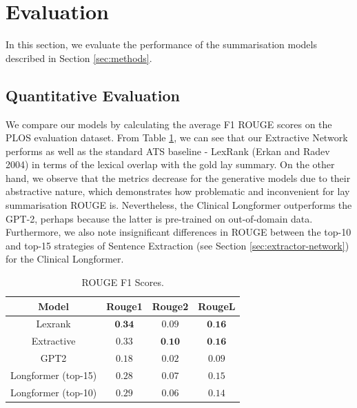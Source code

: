 \documentclass[
]{article}
\begin{document}
\hypertarget{sec:evaluation}{%
\section{Evaluation}\label{sec:evaluation}}

In this section, we evaluate the performance of the summarisation models
described in Section \ref{sec:methods}.

\hypertarget{sec:evaluation-quantitative}{%
\subsection{Quantitative Evaluation}\label{sec:evaluation-quantitative}}

We compare our models by calculating the average F1 ROUGE scores on the
PLOS evaluation dataset. From Table \ref{tab:dataset_stats}, we can see
that our Extractive Network performs as well as the standard ATS
baseline - LexRank (Erkan and Radev 2004) in terms of the lexical
overlap with the gold lay summary. On the other hand, we observe that
the metrics decrease for the generative models due to their abstractive
nature, which demonstrates how problematic and inconvenient for lay
summarisation ROUGE is. Nevertheless, the Clinical Longformer
outperforms the GPT-2, perhaps because the latter is pre-trained on
out-of-domain data. Furthermore, we also note insignificant differences
in ROUGE between the top-10 and top-15 strategies of Sentence Extraction
(see Section \ref{sec:extractor-network}) for the Clinical Longformer.

\begin{table}[htbp]
    \centering
    \begin{tabular}{|c|c|c|c|}
        \hline
        \textbf{Model} & \textbf{Rouge1} & \textbf{Rouge2} & \textbf{RougeL} \\
        \hline
            Lexrank & $\textbf{0.34}$ & $0.09$ & $\textbf{0.16}$ \\
        \hline
            Extractive & $0.33$ & $\textbf{0.10}$ & $\textbf{0.16}$ \\
        \hline
            GPT2 & $0.18$ & $0.02$ & $0.09$ \\
        \hline
            Longformer (top-15) & $0.28$ & $0.07$ & $0.15$ \\
        \hline
            Longformer (top-10) & $0.29$ & $0.06$ & $0.14$ \\
        \hline
    \end{tabular}
    \caption{ROUGE F1 Scores.}\label{tab:dataset_stats}
\end{table}
\end{document}
